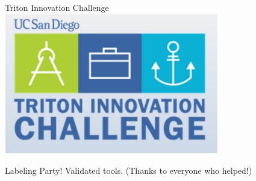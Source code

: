 \begin{frame}{Triton Innovation Challenge}
  \centering
  \includegraphics[height=0.7\textheight,width=0.7\textwidth,keepaspectratio]{images/TritonInnovation.png}
\end{frame}

\begin{frame}{Labeling Party!}
  Validated tools. (Thanks to everyone who helped!)
\end{frame}

